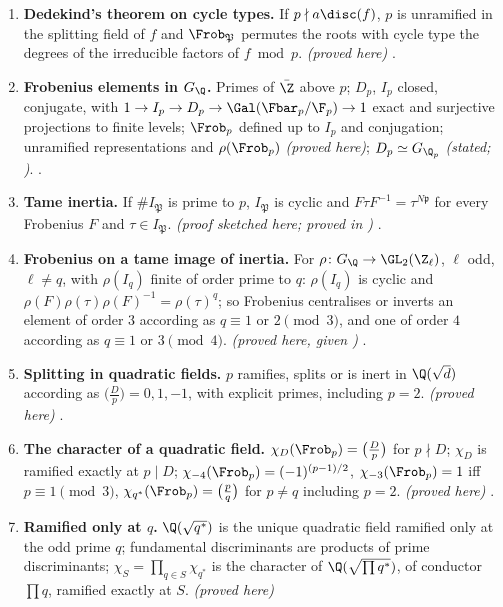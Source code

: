 \begin{enumerate}[label=\textbf{\thechapter.\arabic*}]
the orbit lengths. \emph{(proved here)} .
\item \textbf{Dedekind's theorem on cycle types.} If $p\nmid a\disc(f)$, $p$ is unramified in the splitting field of $f$ and $\Frob_{\mathfrak P}$ permutes the roots with
cycle type the degrees of the irreducible factors of $f\bmod p$. \emph{(proved here)} .
\item \textbf{Frobenius elements in $G_\Q$.} Primes of $\bar\Z$ above $p$; $D_p$, $I_p$ closed, conjugate, with $1\to I_p\to D_p\to\Gal(\Fbar_p/\F_p)\to1$ exact and surjective
projections to finite levels; $\Frob_p$ defined up to $I_p$ and conjugation; unramified representations and $\rho(\Frob_p)$ \emph{(proved here)}; $D_p\simeq G_{\Q_p}$
\emph{(stated; )}. .
\item \textbf{Tame inertia.} If $\#I_{\mathfrak P}$ is prime to $p$, $I_{\mathfrak P}$ is cyclic and $F\tau F^{-1}=\tau^{N\mathfrak p}$ for every Frobenius $F$ and
$\tau\in I_{\mathfrak P}$. \emph{(proof sketched here; proved in )} .
\item \textbf{Frobenius on a tame image of inertia.} For $\rho\colon G_\Q\to\GL_2(\Z_\ell)$, $\ell$ odd, $\ell\ne q$, with $\rho(I_q)$ finite of order prime to $q$:
$\rho(I_q)$ is cyclic and $\rho(F)\rho(\tau)\rho(F)^{-1}=\rho(\tau)^q$; so Frobenius centralises or inverts an element of order $3$ according as $q\equiv1$ or $2\pmod3$,
and one of order $4$ according as $q\equiv1$ or $3\pmod4$. \emph{(proved here, given )} .
\item \textbf{Splitting in quadratic fields.} $p$ ramifies, splits or is inert in $\Q(\sqrt d)$ according as $\bigl(\frac Dp\bigr)=0,1,-1$, with explicit primes,
including $p=2$. \emph{(proved here)} .
\item \textbf{The character of a quadratic field.} $\chi_D(\Frob_p)=\bigl(\frac Dp\bigr)$ for $p\nmid D$; $\chi_D$ is ramified exactly at $p\mid D$; $\chi_{-4}(\Frob_p)=(-1)^{(p-1)/2}$,
$\chi_{-3}(\Frob_p)=1$ iff $p\equiv1\pmod3$, $\chi_{q^*}(\Frob_p)=\bigl(\frac pq\bigr)$ for $p\ne q$ including $p=2$. \emph{(proved here)} .
\item \textbf{Ramified only at $q$.} $\Q(\sqrt{q^*})$ is the unique quadratic field ramified only at the odd prime $q$; fundamental discriminants are products of
prime discriminants; $\chi_S=\prod_{q\in S}\chi_{q^*}$ is the character of $\Q(\sqrt{\prod q^*})$, of conductor $\prod q$, ramified exactly at $S$. \emph{(proved here)}

\end{enumerate}
